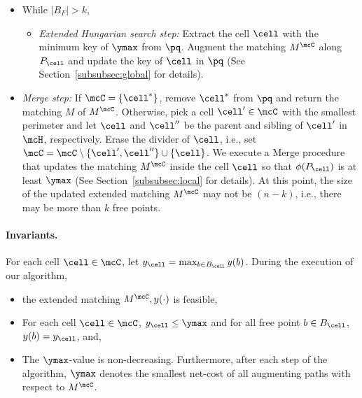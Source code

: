 \begin{itemize}
    \item While $|B_F| > k$, 
    \begin{itemize}
        \item {\it Extended Hungarian search step:} Extract the cell $\cell$ with the minimum key of $\ymax$ from $\pq$. Augment the matching $M^\mcC$ along $P_\cell$ and update the key of $\cell$ in $\pq$ (See Section~\ref{subsubsec:global} for details).
    \end{itemize}
    \item {\it Merge step:} If $\mcC=\{\cell^*\}$, remove $\cell^*$ from $\pq$ and return the matching $M$ of $M^{\mcC}$. Otherwise, pick a cell $\cell'\in\mcC$ with the smallest perimeter and let $\cell$ and $\cell''$ be the parent and sibling of $\cell'$ in $\mcH$, respectively. Erase the divider of $\cell$, i.e., set $\mcC=\mcC\setminus\{\cell',\cell''\}\cup \{\cell\}$. 
    We execute a Merge procedure that updates the matching $M^\mcC$ inside the cell $\cell$ so that $\phi(P_\cell)$ is at least $\ymax$ (See Section~\ref{subsubsec:local} for details). At this point, the size of the updated extended matching $M^{\mcC}$ may not be $(n-k)$, i.e., there may be more than $k$ free points.
\end{itemize}

\paragraph{Invariants.} For each cell $\cell \in \mcC$, let $y_\cell= \max_{b\in B_\cell}y(b)$. During the execution of our algorithm,
\begin{itemize}
    \item[(I1)] the extended matching $M^\mcC, y(\cdot)$ is feasible,
    \item[(I2)] For each cell $\cell \in \mcC$, $y_\cell \le \ymax$ and for all free point $b\in B_\cell$, $y(b)=y_{\cell}$, and,
   \item[(I3)] The $\ymax$-value is non-decreasing. Furthermore, after each step of the algorithm, $\ymax$ denotes the smallest net-cost of all augmenting paths with respect to $M^{\mcC}$.
\end{itemize}


